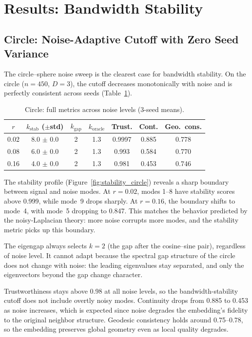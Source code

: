 \documentclass{article}
\begin{document}
\clearpage
\section{Results: Bandwidth Stability}
\label{sec:results_stability}

\subsection{Circle: Noise-Adaptive Cutoff with Zero Seed Variance}

The circle--sphere noise sweep is the clearest case for bandwidth stability. On the circle ($n = 450$, $D = 3$), the cutoff decreases monotonically with noise and is perfectly consistent across seeds (Table~\ref{tab:circle_results}).

\begin{table}[htbp]
\caption{Circle: full metrics across noise levels (3-seed means).}
\label{tab:circle_results}
\centering
\begin{tabular}{@{}ccccccc@{}}
\toprule
$r$ & $k_{\text{stab}}$ ($\pm$std) & $k_{\text{gap}}$ & $k_{\text{oracle}}$ & Trust. & Cont. & Geo.\ cons. \\
\midrule
0.02 & 8.0 $\pm$ 0.0 & 2 & 1.3 & 0.9997 & 0.885 & 0.778 \\
0.08 & 6.0 $\pm$ 0.0 & 2 & 1.3 & 0.993 & 0.584 & 0.770 \\
0.16 & 4.0 $\pm$ 0.0 & 2 & 1.3 & 0.981 & 0.453 & 0.746 \\
\bottomrule
\end{tabular}
\end{table}

The stability profile (Figure~\ref{fig:stability_circle}) reveals a sharp boundary between signal and noise modes. At $r = 0.02$, modes 1--8 have stability scores above 0.999, while mode~9 drops sharply. At $r = 0.16$, the boundary shifts to mode~4, with mode~5 dropping to 0.847. This matches the behavior predicted by the noisy-Laplacian theory: more noise corrupts more modes, and the stability metric picks up this boundary.

The eigengap always selects $k = 2$ (the gap after the cosine--sine pair), regardless of noise level. It cannot adapt because the spectral gap structure of the circle does not change with noise: the leading eigenvalues stay separated, and only the eigenvectors beyond the gap change character.

Trustworthiness stays above 0.98 at all noise levels, so the bandwidth-stability cutoff does not include overtly noisy modes. Continuity drops from 0.885 to 0.453 as noise increases, which is expected since noise degrades the embedding's fidelity to the original neighbor structure. Geodesic consistency holds around 0.75--0.78, so the embedding preserves global geometry even as local quality degrades.
\end{document}
